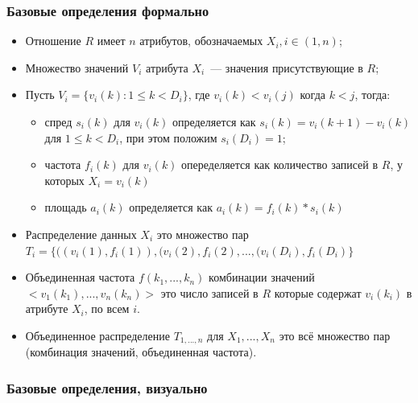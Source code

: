 \documentclass{beamer}
\begin{document}
\begin{frame}
\frametitle{Базовые определения формально}

\begin{itemize}
  \item Отношение $R$ имеет $n$ атрибутов, обозначаемых $X_i, i \in (1, n)$;
  \item Множество значений $V_i$ атрибута $X_i$~--- значения присутствующие в $R$;
  \item Пусть $V_i = \{v_i(k): 1 \le k < D_i\}$, где $v_i(k) < v_i(j)$ когда $k < j$, тогда: 
  \begin{itemize}
    \item \alert{спред}  $s_i(k)$ для $v_i(k)$ определяется как $s_i(k) = v_i(k+1) - v_i(k)$ для $1 \le k < D_i$, при этом положим $s_i(D_i) = 1$;
    \item \alert{частота} $f_i(k)$ для $v_i(k)$ опеределяется как количество записей в $R$, у которых $X_i = v_i(k)$
    \item \alert{площадь} $a_i(k)$ определяется как $a_i(k) = f_i(k) * s_i(k)$
  \end{itemize}
  \item Распределение данных $X_i$ это множество пар $T_i = \{((v_i(1), f_i(1)), (v_i(2), f_i(2), ..., (v_i(D_i), f_i(D_i)\}$
  \item Объединенная частота $f(k_1, ..., k_n)$ комбинации значений $<v_1(k_1), ..., v_n(k_n)>$ это число записей в $R$ которые содержат $v_i(k_i)$ в атрибуте $X_i$, по всем $i$.
  \item Объединенное распределение $T_{1, ..., n}$ для $X_1, ..., X_n$ это всё множество пар (комбинация значений, объединенная частота).
\end{itemize}

\end{frame}


\begin{frame}
\frametitle{Базовые определения, визуально}
\center
{}

\end{frame}
\end{document}
